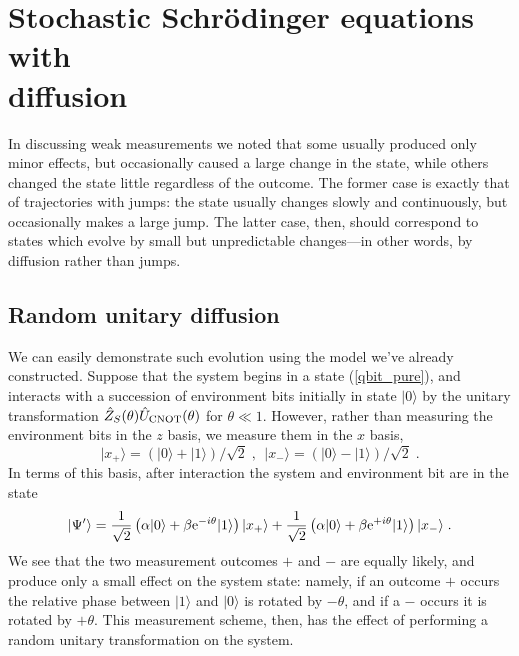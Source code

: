 \documentclass[12pt]{article}
\def\ket#1{{| #1 \rangle}}
\def\e{{\rm e}}
\def\U{{\hat U}}
\def\Z{{\hat Z}}
\begin{document}
\section{Stochastic Schr\"odinger equations with \\ diffusion}

In discussing weak measurements we noted that some usually produced only
minor effects, but occasionally caused a large change in the state, while
others changed the state little regardless of the outcome.  The former
case is exactly that of trajectories with jumps:  the state usually
changes slowly and continuously, but occasionally makes a large jump.
The latter case, then, should correspond to states which evolve by small
but unpredictable changes---in other words, by diffusion rather than jumps.

\subsection{Random unitary diffusion}

We can easily demonstrate such evolution using the model we've already
constructed.  Suppose that the system begins in a state
(\ref{qbit_pure}), and interacts with a succession of environment bits
initially in state $\ket0$ by the unitary transformation
$\Z_S(\theta)\U_{\rm CNOT}(\theta)$ for $\theta\ll1$.
However, rather than measuring the environment bits in the $z$ basis,
we measure them in the $x$ basis,
\begin{equation}
\ket{x_+} = (\ket0 + \ket1)/\sqrt2 \;,\ \ 
\ket{x_-} = (\ket0 - \ket1)/\sqrt2 \;.
\end{equation}
In terms of this basis, after interaction the system and environment
bit are in the state
\begin{equation}
\ket{\Psi'} = {1\over\sqrt2}\left( \alpha\ket0 +
  \beta\e^{-i\theta}\ket1 \right) \ket{x_+} +
  {1\over\sqrt2}\left( \alpha\ket0 +
  \beta\e^{+i\theta}\ket1 \right) \ket{x_-} \;.
\end{equation}
We see that the two measurement outcomes $+$ and $-$ are equally likely,
and produce only a small effect on the system state:  namely, if an outcome
$+$ occurs the relative phase between $\ket1$ and $\ket0$ is rotated
by $-\theta$, and if a $-$ occurs it is rotated by $+\theta$.  This
measurement scheme, then, has the effect
of performing a random unitary transformation on the system.
\end{document}
